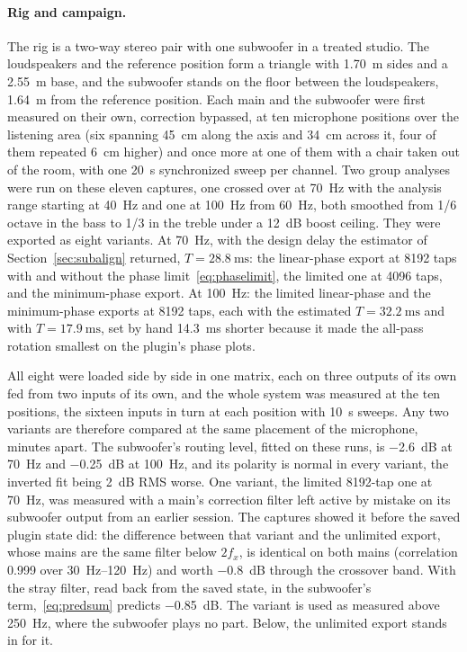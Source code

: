 \documentclass[10pt,a4paper]{article}
\begin{document}
\paragraph{Rig and campaign.} The rig is a two-way stereo pair with one subwoofer in a treated studio. The loudspeakers and the reference position form a triangle with \SI{1.70}{\metre} sides and a \SI{2.55}{\metre} base, and the subwoofer stands on the floor between the loudspeakers, \SI{1.64}{\metre} from the reference position. Each main and the subwoofer were first measured on their own, correction bypassed, at ten microphone positions over the listening area (six spanning \SI{45}{\centi\metre} along the axis and \SI{34}{\centi\metre} across it, four of them repeated \SI{6}{\centi\metre} higher) and once more at one of them with a chair taken out of the room, with one \SI{20}{\second} synchronized sweep per channel. Two group analyses were run on these eleven captures, one crossed over at \SI{70}{\hertz} with the analysis range starting at \SI{40}{\hertz} and one at \SI{100}{\hertz} from \SI{60}{\hertz}, both smoothed from 1/6 octave in the bass to 1/3 in the treble under a \SI{12}{\dB} boost ceiling. They were exported as eight variants. At \SI{70}{\hertz}, with the design delay the estimator of Section~\ref{sec:subalign} returned, $T=\SI{28.8}{\milli\second}$: the linear-phase export at 8192 taps with and without the phase limit~\eqref{eq:phaselimit}, the limited one at 4096 taps, and the minimum-phase export. At \SI{100}{\hertz}: the limited linear-phase and the minimum-phase exports at 8192 taps, each with the estimated $T=\SI{32.2}{\milli\second}$ and with $T=\SI{17.9}{\milli\second}$, set by hand \SI{14.3}{\milli\second} shorter because it made the all-pass rotation smallest on the plugin's phase plots.

All eight were loaded side by side in one matrix, each on three outputs of its own fed from two inputs of its own, and the whole system was measured at the ten positions, the sixteen inputs in turn at each position with \SI{10}{\second} sweeps. Any two variants are therefore compared at the same placement of the microphone, minutes apart. The subwoofer's routing level, fitted on these runs, is \SI{-2.6}{\dB} at \SI{70}{\hertz} and \SI{-0.25}{\dB} at \SI{100}{\hertz}, and its polarity is normal in every variant, the inverted fit being \SI{2}{\dB} RMS worse. One variant, the limited 8192-tap one at \SI{70}{\hertz}, was measured with a main's correction filter left active by mistake on its subwoofer output from an earlier session. The captures showed it before the saved plugin state did: the difference between that variant and the unlimited export, whose mains are the same filter below $2f_x$, is identical on both mains (correlation 0.999 over \SIrange{30}{120}{\hertz}) and worth \SI{-0.8}{\dB} through the crossover band. With the stray filter, read back from the saved state, in the subwoofer's term,~\eqref{eq:predsum} predicts \SI{-0.85}{\dB}. The variant is used as measured above \SI{250}{\hertz}, where the subwoofer plays no part. Below, the unlimited export stands in for it.
\end{document}
